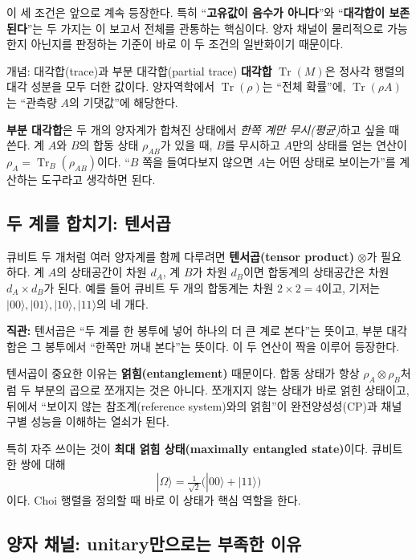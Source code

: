 \documentclass[11pt,a4paper]{article}
\newcommand{\Tr}{\operatorname{Tr}}
\begin{document}
이 세 조건은 앞으로 계속 등장한다. 특히 ``\textbf{고유값이 음수가 아니다}''와 ``\textbf{대각합이 보존된다}''는 두 가지는 이 보고서 전체를 관통하는 핵심이다. 양자 채널이 물리적으로 가능한지 아닌지를 판정하는 기준이 바로 이 두 조건의 일반화이기 때문이다.

\begin{conceptbox}{개념: 대각합(trace)과 부분 대각합(partial trace)}
\textbf{대각합} $\Tr(M)$은 정사각 행렬의 대각 성분을 모두 더한 값이다. 양자역학에서 $\Tr(\rho)$는 ``전체 확률''에, $\Tr(\rho A)$는 ``관측량 $A$의 기댓값''에 해당한다.

\textbf{부분 대각합}은 두 개의 양자계가 합쳐진 상태에서 \emph{한쪽 계만 무시(평균)}하고 싶을 때 쓴다. 계 $A$와 $B$의 합동 상태 $\rho_{AB}$가 있을 때, $B$를 무시하고 $A$만의 상태를 얻는 연산이 $\rho_A=\Tr_B(\rho_{AB})$이다. ``$B$ 쪽을 들여다보지 않으면 $A$는 어떤 상태로 보이는가''를 계산하는 도구라고 생각하면 된다.
\end{conceptbox}

\subsection{두 계를 합치기: 텐서곱}

큐비트 두 개처럼 여러 양자계를 함께 다루려면 \textbf{텐서곱(tensor product)} $\otimes$가 필요하다. 계 $A$의 상태공간이 차원 $d_A$, 계 $B$가 차원 $d_B$이면 합동계의 상태공간은 차원 $d_A\times d_B$가 된다. 예를 들어 큐비트 두 개의 합동계는 차원 $2\times2=4$이고, 기저는 $|00\rangle,|01\rangle,|10\rangle,|11\rangle$의 네 개다.

\begin{intuitionbox}
\textbf{직관:} 텐서곱은 ``두 계를 한 봉투에 넣어 하나의 더 큰 계로 본다''는 뜻이고, 부분 대각합은 그 봉투에서 ``한쪽만 꺼내 본다''는 뜻이다. 이 두 연산이 짝을 이루어 등장한다.
\end{intuitionbox}

텐서곱이 중요한 이유는 \textbf{얽힘(entanglement)} 때문이다. 합동 상태가 항상 $\rho_A\otimes\rho_B$처럼 두 부분의 곱으로 쪼개지는 것은 아니다. 쪼개지지 않는 상태가 바로 얽힌 상태이고, 뒤에서 ``보이지 않는 참조계(reference system)와의 얽힘''이 완전양성성(CP)과 채널 구별 성능을 이해하는 열쇠가 된다.

특히 자주 쓰이는 것이 \textbf{최대 얽힘 상태(maximally entangled state)}이다. 큐비트 한 쌍에 대해
\[
|\Omega\rangle = \tfrac{1}{\sqrt2}\big(|00\rangle+|11\rangle\big)
\]
이다. Choi 행렬을 정의할 때 바로 이 상태가 핵심 역할을 한다.

\subsection{양자 채널: unitary만으로는 부족한 이유}
\end{document}

